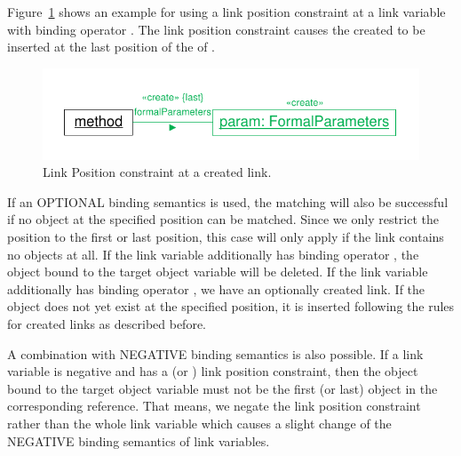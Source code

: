 {Figure~\ref{fig:linkPositionConstraintCreate} shows an example for using a link position constraint at a link variable with binding operator \create. The link position constraint causes the created  to be inserted at the last position of the  of .

\begin{figure}[htbp]
\center
\includegraphics[width=0.75\columnwidth]{figures/LinkPositionConstraintCreate}
\caption{Link Position constraint at a created link.}
\label{fig:linkPositionConstraintCreate}
\end{figure}

If an OPTIONAL binding semantics is used, the matching will also be successful if no object at the specified position can be matched. Since we only restrict the position to the first or last position, this case will only apply if the link contains no objects at all. If the link variable additionally has binding operator \destroy, the object bound to the target object variable will be deleted. If the link variable additionally has binding operator \create, we have an optionally created link. If the object does not yet exist at the specified position, it is inserted following the rules for created links as described before. 

A combination with NEGATIVE binding semantics is also possible. If a link variable is negative and has a  (or ) link position constraint, then the object bound to the target object variable must not be the first (or last) object in the corresponding reference. That means, we negate the link position constraint rather than the whole link variable which causes a slight change of the NEGATIVE binding semantics of link variables.


}

